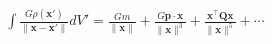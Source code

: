 \documentclass[preview]{standalone}
\begin{document}
\begin{align*}
\int\frac{G\rho(\mathbf x')}{\|\mathbf x-\mathbf x'\|} dV' = \frac{Gm}{\|\mathbf x\|} + \frac{G\mathbf p\cdot\mathbf x}{\|\mathbf x\|^3} + \frac{\mathbf x^\top\mathbf Q\mathbf x}{\|\mathbf x\|^5} +\cdots
\end{align*}
\end{document}
